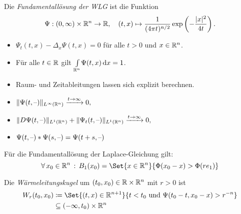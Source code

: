\documentclass{cheat-sheet}
\begin{document}


\begin{defn}
  Die \emph{Fundamentallösung der WLG} ist die Funktion
  \[ \Psi : \left( 0, \infty \right) \times \mathbb{R}^n \to \mathbb{R}, \quad (t, x) \mapsto \frac{1}{(4 \pi t)^{n/2}} \exp\left(- \frac{\lvert x\rvert^2}{4t}\right). \]
\end{defn}

\begin{bemn}
  \begin{itemize}
    \item $\Psi_t(t, x) - \Delta_x \Psi(t, x) = 0$ für alle $t > 0$ und $x \in \mathbb{R}^n$.
    \item Für alle $t \in \mathbb{R}$ gilt ${\textstyle \int\limits_{\mathbb{R}^n}^{}} \Psi(t, x) \,\mathrm{d} x = 1$.
    \item Raum- und Zeitableitungen lassen sich explizit berechnen.
    \item $\lVert\Psi(t, \text{--})\rVert_{L^\infty(\mathbb{R}^n)} \xrightarrow{t \to \infty} 0,$
    \item $\lVert D \Psi(t, \text{--})\rVert_{L^1(\mathbb{R}^n)} + \lVert\Psi_t(t, \text{--})\rVert_{L^1(\mathbb{R}^n)} \xrightarrow{t \to \infty} 0,$
    \item $\Psi(t, \text{--}) * \Psi(s, \text{--}) = \Psi(t+s, \text{--})$
  \end{itemize}
\end{bemn}

\begin{bem}
  Für die Fundamentallösung der Laplace-Gleichung gilt:
  \[
    \fa{x_0 \in \R^n} B_1(x_0) = \Set{ x \in \R^n }{ \Phi(x_0 - x) > \Phi(r e_1) }
  \] %
\end{bem}

\begin{defn}
  Die \emph{Wärmeleitungskugel} um $(t_0, x_0) \in \mathbb{R} \times \mathbb{R}^n$ mit $r > 0$ ist
  \begin{align*}
    W_r(t_0, x_0) &\coloneqq \Set{(t, x) \in \R^{n+1}}{t < t_0 \text{ und } \Psi(t_0-t,x_0-x) > r^{-n}}\\
    &\subseteq \ointerval{-\infty}{t_0} \times \R^n
  \end{align*}
\end{defn}
\end{document}
